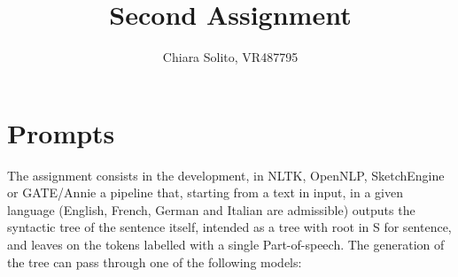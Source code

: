 \documentclass{article}
\begin{document}
    \title{\textbf{Second Assignment}}
    \date{}
    \author{Chiara Solito, VR487795}
    \maketitle

    \section{Prompts}
    The assignment consists in the development, in NLTK, OpenNLP, SketchEngine or GATE/Annie a pipeline that, starting from a text in input, in a given language (English, French, German and Italian are admissible) outputs the syntactic tree of the sentence itself, intended as a tree with root in S for sentence, and leaves on the tokens labelled with a single Part-of-speech. The generation of the tree can pass through one of the following models:
\end{document}
